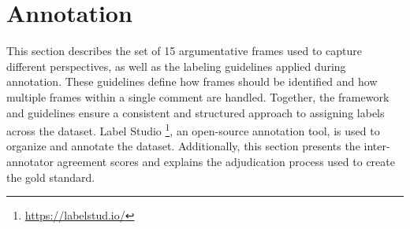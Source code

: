 \documentclass[
10pt, %
a4paper, %
oneside, %
headinclude,footinclude, %
] {book}%
\begin{document}
\section{Annotation}
This section describes the set of 15 argumentative frames used to capture different perspectives, as well as the labeling guidelines applied during annotation. These guidelines define how frames should be identified and how multiple frames within a single comment are handled. Together, the framework and guidelines ensure a consistent and structured approach to assigning labels across the dataset. Label Studio \footnote{\url{https://labelstud.io/}}, an open-source annotation tool, is used to organize and annotate the dataset. Additionally, this section presents the inter-annotator agreement scores and explains the adjudication process used to create the gold standard.
\end{document}
